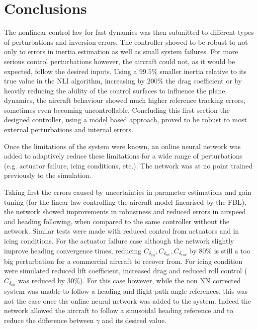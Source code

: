 
\section{Conclusions}
\label{sec:concl}

The nonlinear control law for fast dynamics was then submitted to different types of perturbations and inversion errors. The controller showed to be robust to not only to errors in inertia estimation as well as small system failures. For more serious control perturbations however, the aircraft could not, as it would be expected, follow the desired inputs. Using a $99.5\%$ smaller inertia relative to its true value in the NLI algorithm, increasing by $200\%$ the drag coefficient or by heavily reducing the ability of the control surfaces to influence the plane dynamics, the aircraft behaviour showed much higher reference tracking errors, sometimes even becoming uncontrollable. Concluding this first section the designed controller, using a model based approach, proved to be robust to most external perturbations and internal errors. 

Once the limitations of the system were known, an online neural network was added to adaptively reduce these limitations for a wide range of perturbations (e.g. actuator failure, icing conditions, etc.). The network was at no point trained previously to the simulation. 

Taking first the errors caused by uncertainties in parameter estimations and gain tuning (for the linear law controlling the aircraft model linearised by the FBL), the network showed improvements in robustness and reduced errors in airspeed and heading following, when compared to the same controller without the network. Similar tests were made with reduced control from actuators and in icing conditions. For the actuator failure case although the network slightly improve heading convergence times, reducing $C_{\delta_{ail}}, C_{\delta_{ele}}, C_{\delta_{rud}}$ by 80\% is still a too big perturbation for a commercial aircraft to recover from. For icing condition were simulated reduced lift coefficient, increased drag and reduced roll control ($C_{\delta_{ail}}$ was reduced by 30\%). For this case however, while the non NN corrected system was unable to follow a heading and flight path angle references, this was not the case once the online neural network was added to the system. Indeed the network allowed the aircraft to follow a sinusoidal heading reference and to reduce the difference between $\gamma$ and its desired value. 

